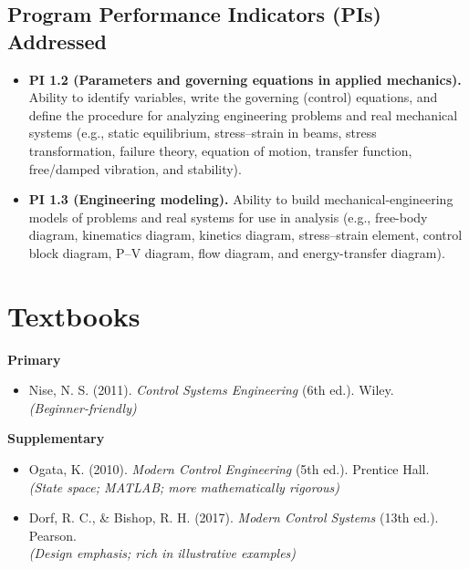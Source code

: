 \documentclass[11pt]{article}
\begin{document}
\subsection{Program Performance Indicators (PIs) Addressed}
\begin{itemize}
    \item \textbf{PI 1.2 (Parameters and governing equations in applied mechanics).}
          Ability to identify variables, write the governing (control) equations, and
          define the procedure for analyzing engineering problems and real mechanical
          systems (e.g., static equilibrium, stress--strain in beams, stress
          transformation, failure theory, equation of motion, transfer function,
          free/damped vibration, and stability).
    \item \textbf{PI 1.3 (Engineering modeling).} Ability to build mechanical-engineering
          models of problems and real systems for use in analysis (e.g., free-body
          diagram, kinematics diagram, kinetics diagram, stress--strain element, control
          block diagram, P--V diagram, flow diagram, and energy-transfer diagram).
\end{itemize}

\section{Textbooks}
\textbf{Primary}
\begin{itemize}
    \item Nise, N. S. (2011). \emph{Control Systems Engineering} (6th ed.). Wiley.
          \\\hfill\textit{(Beginner-friendly)}
\end{itemize}
\textbf{Supplementary}
\begin{itemize}
    \item Ogata, K. (2010). \emph{Modern Control Engineering} (5th ed.). Prentice Hall.
          \\\hfill\textit{(State space; MATLAB; more mathematically rigorous)}
    \item Dorf, R. C., \& Bishop, R. H. (2017). \emph{Modern Control Systems} (13th ed.). Pearson.
          \\\hfill\textit{(Design emphasis; rich in illustrative examples)}
\end{itemize}
\end{document}
